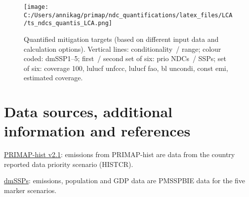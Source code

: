 \documentclass[12pt]{article}
\begin{document}
 \begin{figure}[H]
 \centering
 \texttt{[image: C:/Users/annikag/primap/ndc\_quantifications/latex\_files/LCA/ts\_ndcs\_quantis\_LCA.png]}
 \caption{Quantified mitigation targets (based on different input data and calculation options).
 Vertical lines: conditionality~/ range;
 colour coded: dmSSP1--5;
 first~/ second set of six: prio NDCs~/ SSPs;
 set of six: coverage 100, lulucf unfccc, lulucf fao, bl uncondi, const emi, estimated coverage.}
 \label{fig:miti}
 \end{figure}

 \newpage %
 \section{Data sources, additional information and references}
 \label{sec:dataSourcesRefs}

 \noindent \href{https://dataservices.gfz-potsdam.de/pik/showshort.php?id=escidoc:4736895}{PRIMAP-hist v2.1}: emissions from PRIMAP-hist are data from the country reported data priority scenario (HISTCR).

 \noindent \href{https://zenodo.org/record/3638137#.X2syXouxU2w}{dmSSPs}: emissions, population and GDP data are PMSSPBIE data for the five marker scenarios.
\end{document}
